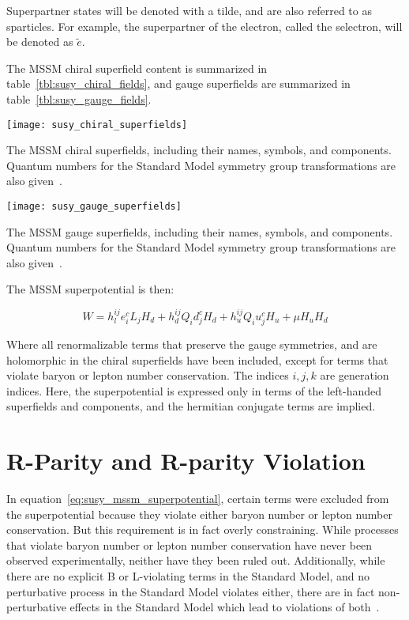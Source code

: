 Superpartner states will be denoted with a tilde, and are also referred to as sparticles.
For example, the superpartner of the electron, called the selectron, will be denoted as $\tilde{e}$.

The MSSM chiral superfield content is summarized in table~\ref{tbl:susy_chiral_fields},
and gauge superfields are summarized in table~\ref{tbl:susy_gauge_fields}.

\begin{table}[!ht]\label{tbl:susy_chiral_fields}
    \centering


  \texttt{[image: susy\_chiral\_superfields]}
    \caption{The MSSM chiral superfields, including their names, symbols, and components.
  Quantum numbers for the Standard Model symmetry group transformations are also given~\cite{susy-primer-1998}.}
\end{table}

\begin{table}[!ht]\label{tbl:susy_gauge_fields}
    \centering

  \texttt{[image: susy\_gauge\_superfields]}
    \caption{The MSSM gauge superfields, including their names, symbols, and components.
  Quantum numbers for the Standard Model symmetry group transformations are also given~\cite{susy-primer-1998}.}
\end{table}

The MSSM superpotential is then:

\begin{equation}\label{eq:susy_mssm_superpotential}
    W = h_l^{ij} e_i^c L_j H_d + h_d^{ij} Q_i d_j^c H_d + h_u^{ij} Q_i u_j^c H_u + \mu H_u H_d
\end{equation}

Where all renormalizable terms that preserve the gauge symmetries, and are holomorphic in the chiral superfields have been included,
except for terms that violate baryon or lepton number conservation.
The indices $i, j, k$ are generation indices.
Here, the superpotential is expressed only in terms of the left-handed superfields and components,
and the hermitian conjugate terms are implied.

\section{R-Parity and R-parity Violation}\label{sec:susy_rpv}

In equation~\ref{eq:susy_mssm_superpotential}, certain terms were excluded from the superpotential because they
violate either baryon number or lepton number conservation.
But this requirement is in fact overly constraining.
While processes that violate baryon number or lepton number conservation have never been observed experimentally,
neither have they been ruled out.
Additionally, while there are no explicit B or L-violating terms in the Standard Model,
and no perturbative process in the Standard Model violates either,
there are in fact non-perturbative effects in the Standard Model which lead to violations of both~\cite{susy-bl-violation}.

